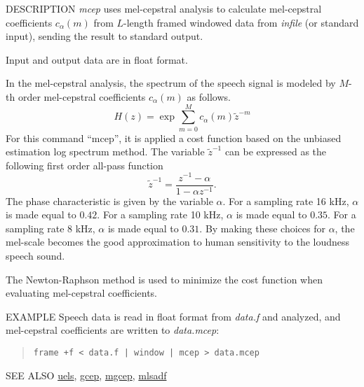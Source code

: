 \begin{synopsis}
\item [mcep] [ --a $A$ ] [ --m $M$ ] [ --l $L$ ] [ --i $I$ ] [ --j $J$ ] 
	     [ --d $D$ ] [ --e $E$ ] [ --f $F$ ] [ {\em infile} ]
\end{synopsis}

\begin{qsection}{DESCRIPTION}
{\em mcep} uses mel-cepstral analysis 
to calculate mel-cepstral coefficients $c_{\alpha}(m)$ 
from $L$-length framed windowed data from {\em infile} (or standard input), 
sending the result to standard output.

Input and output data are in float format.

In the mel-cepstral analysis, the spectrum of the speech signal
is modeled by $M$-th order mel-cepstral coefficients $c_{\alpha}(m)$
as follows.
\begin{displaymath}
H(z) = \exp \sum_{m=0}^M c_{\alpha}(m) \tilde{z}^{-m} 
\end{displaymath}
For this command ``mcep'', it is applied a cost function
based on the unbiased estimation log spectrum method.
The variable $\tilde{z}^{-1}$ can be expressed as the following
first order all-pass function
\begin{displaymath}
\tilde{z}^{-1} = \frac{z^{-1}-\alpha}{1-\alpha z^{-1}}.
\end{displaymath}
The phase characteristic is given by the variable $\alpha$.
For a sampling rate 16 kHz, $\alpha$ is made equal to $0.42$.
For a sampling rate 10 kHz, $\alpha$ is made equal to $0.35$.
For a sampling rate 8 kHz, $\alpha$ is made equal to $0.31$.
By making these choices for $\alpha$,
the mel-scale becomes the good approximation to human
sensitivity to the loudness speech sound.

The Newton-Raphson method is used to minimize the cost function
when evaluating mel-cepstral coefficients.
\end{qsection}

\begin{options}
\end{options}

\begin{qsection}{EXAMPLE}
Speech data is read in float format from {\em data.f} and 
analyzed, and mel-cepstral coefficients are written to {\em data.mcep}:
\begin{quote}
 \verb!frame +f < data.f | window | mcep > data.mcep !
\end{quote}
\end{qsection}

\begin{qsection}{SEE ALSO}
\hyperlink{uels}{uels},
\hyperlink{gcep}{gcep},
\hyperlink{mgcep}{mgcep},
\hyperlink{mlsadf}{mlsadf}
\end{qsection}
